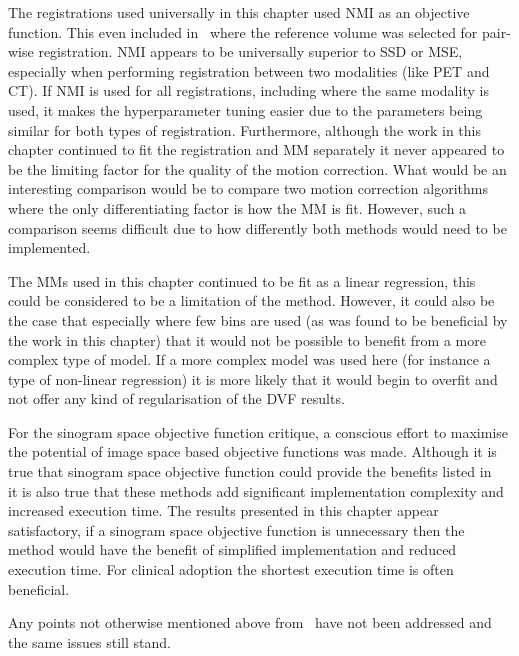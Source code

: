         The registrations used universally in this chapter used \gls{NMI} as an objective function. This even included in~ where the reference volume was selected for pair-wise registration. \gls{NMI} appears to be universally superior to \gls{SSD} or \gls{MSE}, especially when performing registration between two modalities (like \gls{PET} and \gls{CT}). If \gls{NMI} is used for all registrations, including where the same modality is used, it makes the hyperparameter tuning easier due to the parameters being similar for both types of registration. Furthermore, although the work in this chapter continued to fit the registration and \gls{MM} separately it never appeared to be the limiting factor for the quality of the motion correction. What would be an interesting comparison would be to compare two motion correction algorithms where the only differentiating factor is how the \gls{MM} is fit. However, such a comparison seems difficult due to how differently both methods would need to be implemented.
        
        The \glspl{MM} used in this chapter continued to be fit as a linear regression, this could be considered to be a limitation of the method. However, it could also be the case that especially where few bins are used (as was found to be beneficial by the work in this chapter) that it would not be possible to benefit from a more complex type of model. If a more complex model was used here (for instance a type of non-linear regression) it is more likely that it would begin to overfit and not offer any kind of regularisation of the \gls{DVF} results.

        For the sinogram space objective function critique, a conscious effort to maximise the potential of image space based objective functions was made. Although it is true that sinogram space objective function could provide the benefits listed in~ it is also true that these methods add significant implementation complexity and increased execution time. The results presented in this chapter appear satisfactory, if a sinogram space objective function is unnecessary then the method would have the benefit of simplified implementation and reduced execution time. For clinical adoption the shortest execution time is often beneficial.

        Any points not otherwise mentioned above from~ have not been addressed and the same issues still stand.
